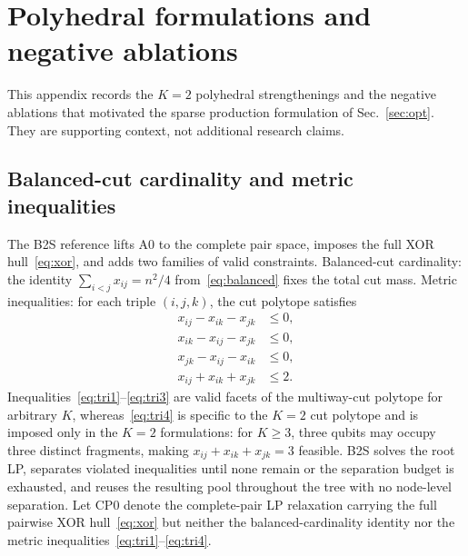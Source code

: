 \documentclass[
  aps,
  pra,
  reprint,
  amsmath,
  amssymb,
  longbibliography,
  nofootinbib,
  floatfix
]{revtex4-2}
\theoremstyle{plain}
\begin{document}
\section{Polyhedral formulations and negative ablations}
\label{app:poly}

This appendix records the $K=2$ polyhedral strengthenings and the negative ablations that motivated the sparse production formulation of Sec.~\ref{sec:opt}. They are supporting context, not additional research claims.

\subsection{Balanced-cut cardinality and metric inequalities}

The B2S reference lifts A0 to the complete pair space, imposes the full XOR hull~\eqref{eq:xor}, and adds two families of valid constraints. Balanced-cut cardinality: the identity $\sum_{i<j}x_{ij}=n^2/4$ from~\eqref{eq:balanced} fixes the total cut mass. Metric inequalities: for each triple $(i,j,k)$, the cut polytope satisfies~\cite{deza1997}
\begin{align}
  x_{ij} - x_{ik} - x_{jk} &\leq 0, \label{eq:tri1}\\
  x_{ik} - x_{ij} - x_{jk} &\leq 0, \label{eq:tri2}\\
  x_{jk} - x_{ij} - x_{ik} &\leq 0, \label{eq:tri3}\\
  x_{ij} + x_{ik} + x_{jk} &\leq 2. \label{eq:tri4}
\end{align}
Inequalities~\eqref{eq:tri1}--\eqref{eq:tri3} are valid facets of the multiway-cut polytope for arbitrary $K$, whereas~\eqref{eq:tri4} is specific to the $K=2$ cut polytope and is imposed only in the $K=2$ formulations: for $K\ge3$, three qubits may occupy three distinct fragments, making $x_{ij}+x_{ik}+x_{jk}=3$ feasible. B2S solves the root LP, separates violated inequalities until none remain or the separation budget is exhausted, and reuses the resulting pool throughout the tree with no node-level separation. Let CP0 denote the complete-pair LP relaxation carrying the full pairwise XOR hull~\eqref{eq:xor} but neither the balanced-cardinality identity nor the metric inequalities~\eqref{eq:tri1}--\eqref{eq:tri4}.
\end{document}
